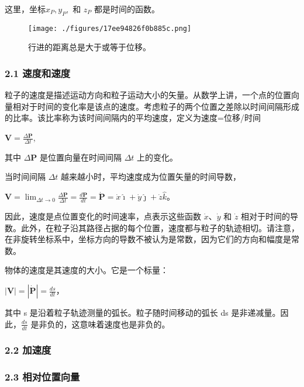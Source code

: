 这里，坐标$x_P, y_P,$ 和 $z_P$ 都是时间的函数。

\begin{figure}[ht]
\centering
\texttt{[image: ./figures/17ee94826f0b885c.png]}
\caption{行进的距离总是大于或等于位移。} \label{fig_YDX_7}
\end{figure}

\subsubsection{2.1 速度和速度}

粒子的速度是描述运动方向和粒子运动大小的矢量。从数学上讲，一个点的位置向量相对于时间的变化率是该点的速度。考虑粒子的两个位置之差除以时间间隔形成的比率。该比率称为该时间间隔内的平均速度，定义为速度=位移/时间

$\mathbf{V} = \frac{\Delta \mathbf{P}}{\Delta t}$,

其中 $\Delta \mathbf{P}$ 是位置向量在时间间隔 $\Delta t$ 上的变化。

当时间间隔 $\Delta t$ 越来越小时，平均速度成为位置矢量的时间导数，

$\mathbf{V} = \lim_{\Delta t \to 0} \frac{\Delta \mathbf{P}}{\Delta t} = \frac{d \mathbf{P}}{dt} = \dot{\mathbf{P}} = \dot{x}\hat{\imath} + \dot{y}\hat{\jmath} + \dot{z}\hat{k}$。

因此，速度是点位置变化的时间速率，点表示这些函数 $\dot{x}$、$\dot{y}$ 和 $\dot{z}$ 相对于时间的导数。此外，在粒子沿其路径占据的每个位置，速度都与粒子的轨迹相切。请注意，在非旋转坐标系中，坐标方向的导数不被认为是常数，因为它们的方向和幅度是常数。

物体的速度是其速度的大小。它是一个标量：

$\left| \mathbf{V} \right| = \left| \dot{\mathbf{P}} \right| = \frac{ds}{dt}$，

其中 s 是沿着粒子轨迹测量的弧长。粒子随时间移动的弧长 ds 是非递减量。因此，$\frac{ds}{dt}$ 是非负的，这意味着速度也是非负的。






\subsubsection{2.2 加速度}



\subsubsection{2.3 相对位置向量}



